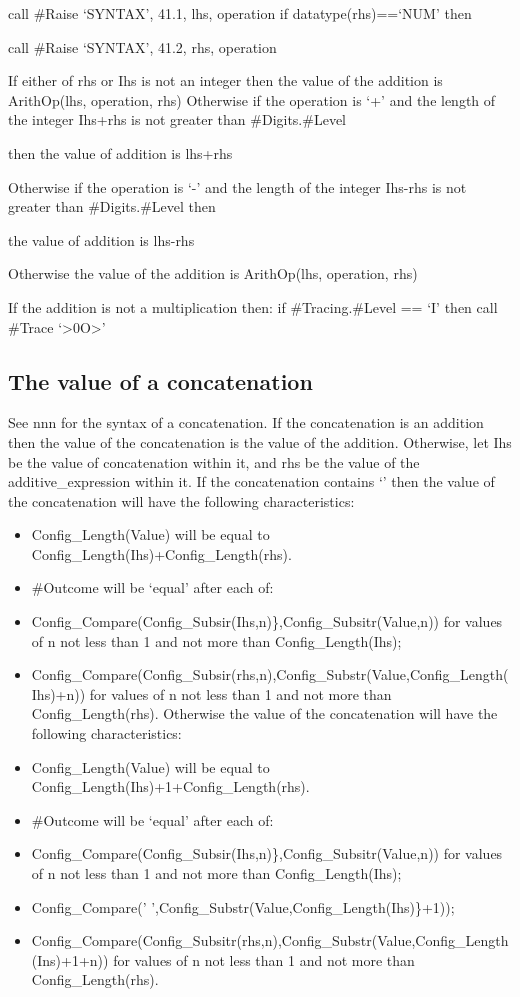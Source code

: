 call \#Raise `SYNTAX', 41.1, lhs, operation if datatype(rhs)==`NUM' then

call \#Raise `SYNTAX', 41.2, rhs, operation

If either of rhs or Ihs is not an integer then the value of the addition
is ArithOp(lhs, operation, rhs) Otherwise if the operation is `+' and
the length of the integer Ihs+rhs is not greater than \#Digits.\#Level

then the value of addition is lhs+rhs

Otherwise if the operation is `-' and the length of the integer Ihs-rhs
is not greater than \#Digits.\#Level then

the value of addition is lhs-rhs

Otherwise the value of the addition is ArithOp(lhs, operation, rhs)

If the addition is not a multiplication then: if \#Tracing.\#Level ==
`I' then call \#Trace `\textgreater0O\textgreater{}'

\hypertarget{the-value-of-a-concatenation}{%
\subsection{The value of a
concatenation}\label{the-value-of-a-concatenation}}

See nnn for the syntax of a concatenation. If the concatenation is an
addition then the value of the concatenation is the value of the
addition. Otherwise, let Ihs be the value of concatenation within it,
and rhs be the value of the additive\_expression within it. If the
concatenation contains `\textbar\textbar{}' then the value of the
concatenation will have the following characteristics:

\begin{itemize}
\item
  Config\_Length(Value) will be equal to
  Config\_Length(Ihs)+Config\_Length(rhs).
\item
  \#Outcome will be `equal' after each of:
\item
  Config\_Compare(Config\_Subsir(Ihs,n)\},Config\_Subsitr(Value,n)) for
  values of n not less than 1 and not more than Config\_Length(Ihs);
\item
  Config\_Compare(Config\_Subsir(rhs,n),Config\_Substr(Value,Config\_Length(Ihs)+n))
  for values of n not less than 1 and not more than Config\_Length(rhs).
  Otherwise the value of the concatenation will have the following
  characteristics:
\item
  Config\_Length(Value) will be equal to
  Config\_Length(Ihs)+1+Config\_Length(rhs).
\item
  \#Outcome will be `equal' after each of:
\item
  Config\_Compare(Config\_Subsir(Ihs,n)\},Config\_Subsitr(Value,n)) for
  values of n not less than 1 and not more than Config\_Length(Ihs);
\item
  Config\_Compare(' ',Config\_Substr(Value,Config\_Length(Ihs)\}+1));
\item
  Config\_Compare(Config\_Subsitr(rhs,n),Config\_Substr(Value,Config\_Length(Ins)+1+n))
  for values of n not less than 1 and not more than Config\_Length(rhs).
\end{itemize}

